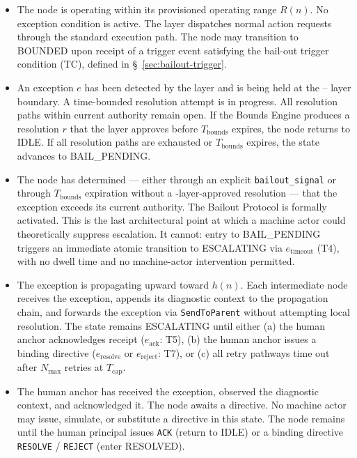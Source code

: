 \begin{itemize}\itemsep=0pt
\item[\textbf{IDLE.}] The node is operating within its provisioned operating range $R(n)$. No exception condition is active. The \fact{} layer dispatches normal action requests through the standard execution path. The node may transition to BOUNDED upon receipt of a trigger event satisfying the bail-out trigger condition (TC), defined in \S~\ref{sec:bailout-trigger}.

\item[\textbf{BOUNDED.}] An exception $e$ has been detected by the \bounds{} layer and is being held at the \bounds{}--\fact{} layer boundary. A time-bounded resolution attempt is in progress. All resolution paths within current authority remain open. If the Bounds Engine produces a resolution $r$ that the \fact{} layer approves before $T_{\text{bounds}}$ expires, the node returns to IDLE. If all resolution paths are exhausted or $T_{\text{bounds}}$ expires, the state advances to BAIL\_PENDING.

\item[\textbf{BAIL\_PENDING.}] The node has determined — either through an explicit \texttt{bailout\_signal} or through $T_{\text{bounds}}$ expiration without a \fact-layer-approved resolution — that the exception exceeds its current authority. The Bailout Protocol is formally activated. This is the last architectural point at which a machine actor could theoretically suppress escalation. It cannot: entry to BAIL\_PENDING triggers an immediate atomic transition to ESCALATING via $e_{\text{timeout}}$ (T4), with no dwell time and no machine-actor intervention permitted.

\item[\textbf{ESCALATING.}] The exception is propagating upward toward $h(n)$. Each intermediate node receives the exception, appends its diagnostic context to the propagation chain, and forwards the exception via \texttt{SendToParent} without attempting local resolution. The state remains ESCALATING until either (a) the human anchor acknowledges receipt ($e_{\text{ack}}$: T5), (b) the human anchor issues a binding directive ($e_{\text{resolve}}$ or $e_{\text{reject}}$: T7), or (c) all retry pathways time out after $N_{\max}$ retries at $T_{\text{cap}}$.

\item[\textbf{HUMAN\_ACKNOWLEDGED.}] The human anchor has received the exception, observed the diagnostic context, and acknowledged it. The node awaits a directive. No machine actor may issue, simulate, or substitute a directive in this state. The node remains until the human principal issues \texttt{ACK} (return to IDLE) or a binding directive \texttt{RESOLVE} / \texttt{REJECT} (enter RESOLVED).


\end{itemize}
